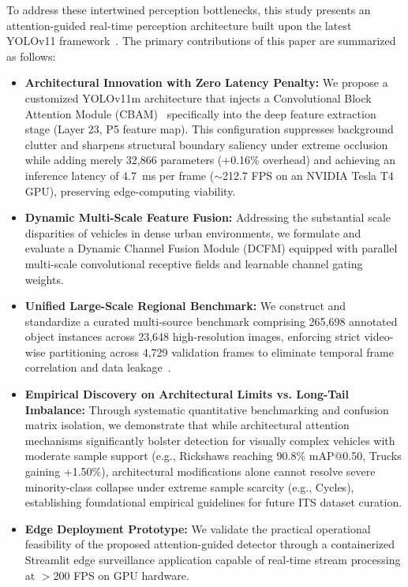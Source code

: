 \documentclass[pdflatex,sn-mathphys]{sn-jnl}
\begin{document}
To address these intertwined perception bottlenecks, this study presents an attention-guided real-time perception architecture built upon the latest YOLOv11 framework~\cite{jocher2024yolo11,khanam2024yolov11}. The primary contributions of this paper are summarized as follows:
\begin{itemize}
    \item \textbf{Architectural Innovation with Zero Latency Penalty:} We propose a customized YOLOv11m architecture that injects a Convolutional Block Attention Module (CBAM)~\cite{woo2018cbam} specifically into the deep feature extraction stage (Layer 23, P5 feature map). This configuration suppresses background clutter and sharpens structural boundary saliency under extreme occlusion while adding merely 32,866 parameters (+0.16\% overhead) and achieving an inference latency of 4.7~ms per frame ($\sim$212.7 FPS on an NVIDIA Tesla T4 GPU), preserving edge-computing viability.
    
    \item \textbf{Dynamic Multi-Scale Feature Fusion:} Addressing the substantial scale disparities of vehicles in dense urban environments, we formulate and evaluate a Dynamic Channel Fusion Module (DCFM) equipped with parallel multi-scale convolutional receptive fields and learnable channel gating weights.
    
    \item \textbf{Unified Large-Scale Regional Benchmark:} We construct and standardize a curated multi-source benchmark comprising 265,698 annotated object instances across 23,648 high-resolution images, enforcing strict video-wise partitioning across 4,729 validation frames to eliminate temporal frame correlation and data leakage~\cite{islam2025bangladeshi,shihavuddin2020dhakaai,sujoy2024monocular}.
    
    \item \textbf{Empirical Discovery on Architectural Limits vs. Long-Tail Imbalance:} Through systematic quantitative benchmarking and confusion matrix isolation, we demonstrate that while architectural attention mechanisms significantly bolster detection for visually complex vehicles with moderate sample support (e.g., Rickshaws reaching 90.8\% mAP@0.50, Trucks gaining +1.50\%), architectural modifications alone cannot resolve severe minority-class collapse under extreme sample scarcity (e.g., Cycles), establishing foundational empirical guidelines for future ITS dataset curation.
    
    \item \textbf{Edge Deployment Prototype:} We validate the practical operational feasibility of the proposed attention-guided detector through a containerized Streamlit edge surveillance application capable of real-time stream processing at $>$200 FPS on GPU hardware.
\end{itemize}
\end{document}
